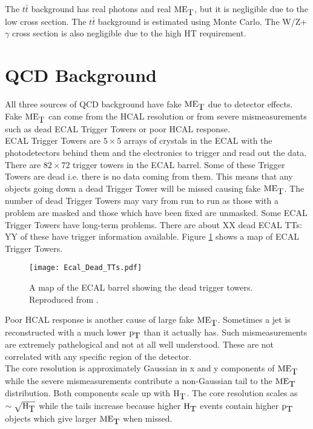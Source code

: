 The $t\bar{t}$ background has real photons and real $\mbox{ME}_{\mbox{T}}$, but it is negligible 
due to the low cross section. The $t\bar{t}$ background is estimated using Monte
Carlo. The W/Z+$\gamma$ cross section is also negligible due to the high HT
requirement.

\section{QCD Background}
\label{sec:QCD_Background}

All three sources of QCD background have fake $\mbox{ME}_{\mbox{T}}$ due to detector effects.
Fake $\mbox{ME}_{\mbox{T}}$ can come from the HCAL resolution or from severe mismeasurements
such as dead ECAL Trigger Towers or poor HCAL response. \\

ECAL Trigger Towers are $5\times5$ arrays of crystals in the ECAL with the
photodetectors behind them and the electronics to trigger and read out the data. 
There are $82\times72$ trigger towers in the ECAL barrel. Some of these Trigger
Towers are dead i.e. there is no data coming from them. This means that any
objects going down a dead Trigger Tower will be missed causing fake $\mbox{ME}_{\mbox{T}}$. The 
number of dead Trigger Towers may vary from run to run as those with a problem 
are masked and those which have been fixed are unmasked. Some ECAL Trigger 
Towers have long-term problems. There are about XX dead ECAL TTs: YY of these 
have trigger information available. Figure \ref{fig:Dead_ECAL_TTs} shows a map 
of ECAL Trigger Towers. \\

\begin{figure}
\begin{center}
\texttt{[image: Ecal\_Dead\_TTs.pdf]}
\end{center}
\caption{A map of the ECAL barrel showing the dead trigger towers. Reproduced
from \cite{spikes}.}
\label{fig:Dead_ECAL_TTs}
\end{figure}

Poor HCAL response is another cause of large fake $\mbox{ME}_{\mbox{T}}$. Sometimes a jet is
reconstructed with a much lower $\mbox{p}_{\mbox{T}}$ than it actually has. Such mismeasurements
are extremely pathelogical and not at all well understood. These are not
correlated with any specific region of the detector. \\

The core resolution is approximately Gaussian in x and y components of $\mbox{ME}_{\mbox{T}}$ 
while the severe mismeasurements contribute a non-Gaussian tail to the $\mbox{ME}_{\mbox{T}}$ 
distribution. Both components scale up with $\mbox{H}_{\mbox{T}}$. The core resolution scales as
$\sim\sqrt{\mbox{H}_{\mbox{T}}}$ while the tails increase because higher $\mbox{H}_{\mbox{T}}$ events contain 
higher $\mbox{p}_{\mbox{T}}$ objects which give larger $\mbox{ME}_{\mbox{T}}$ when missed. \\

